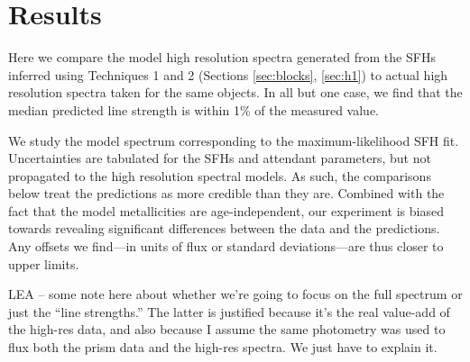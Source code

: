 \documentclass[a4paper,fleqn,usenatbib]{mnras}
\newcommand{\bfb}{\color{myblue}}
\begin{document}
\section{Results}
\label{sec:results}

Here we compare the model high resolution spectra generated from the SFHs inferred using 
Techniques 1 and 2 (Sections \ref{sec:blocks}, \ref{sec:h1}) to actual high resolution spectra taken for
the same objects. In all but one case, we find that the median predicted line strength is within 
1\% of the measured value. 

We study the model spectrum corresponding to
the maximum-likelihood SFH fit. Uncertainties are tabulated for the SFHs and attendant 
parameters, but not propagated to the high resolution spectral models. As such,
the comparisons below treat the predictions as more credible than they are. Combined with the fact 
that the model metallicities are age-independent, our experiment is biased towards 
revealing significant differences between the data and the predictions. Any offsets we find---in units
of flux or standard deviations---are thus closer to upper limits. %

{\bfb LEA -- some note here about whether we're going to focus on the full spectrum or just the ``line
strengths.'' The latter is justified because it's the real value-add of the high-res data, and also because
I assume the same photometry was used to flux both the prism data and the high-res spectra. We
just have to explain it.}


\end{document}
